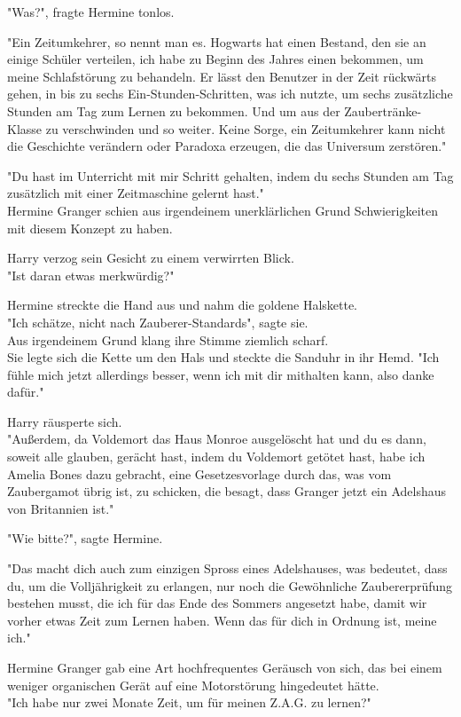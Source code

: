 {"Was?", fragte Hermine tonlos.

"Ein Zeitumkehrer, so nennt man es. Hogwarts hat einen Bestand, den sie an einige Schüler verteilen, ich habe zu Beginn des Jahres einen bekommen, um meine Schlafstörung zu behandeln. Er lässt den Benutzer in der Zeit rückwärts gehen, in bis zu sechs Ein-Stunden-Schritten, was ich nutzte, um sechs zusätzliche Stunden am Tag zum Lernen zu bekommen. Und um aus der Zaubertränke-Klasse zu verschwinden und so weiter. Keine Sorge, ein Zeitumkehrer kann nicht die Geschichte verändern oder Paradoxa erzeugen, die das Universum zerstören."

"Du hast im Unterricht mit mir Schritt gehalten, indem du sechs Stunden am Tag zusätzlich mit einer Zeitmaschine gelernt hast."\\ Hermine Granger schien aus irgendeinem unerklärlichen Grund Schwierigkeiten mit diesem Konzept zu haben.

Harry verzog sein Gesicht zu einem verwirrten Blick.\\ "Ist daran etwas merkwürdig?"

Hermine streckte die Hand aus und nahm die goldene Halskette.\\ "Ich schätze, nicht nach Zauberer-Standards", sagte sie.\\ Aus irgendeinem Grund klang ihre Stimme ziemlich scharf.\\ Sie legte sich die Kette um den Hals und steckte die Sanduhr in ihr Hemd. "Ich fühle mich jetzt allerdings besser, wenn ich mit dir mithalten kann, also danke dafür."

Harry räusperte sich.\\ "Außerdem, da Voldemort das Haus Monroe ausgelöscht hat und du es dann, soweit alle glauben, gerächt hast, indem du Voldemort getötet hast, habe ich Amelia Bones dazu gebracht, eine Gesetzesvorlage durch das, was vom Zaubergamot übrig ist, zu schicken, die besagt, dass Granger jetzt ein Adelshaus von Britannien ist."

"Wie bitte?", sagte Hermine.

"Das macht dich auch zum einzigen Spross eines Adelshauses, was bedeutet, dass du, um die Volljährigkeit zu erlangen, nur noch die Gewöhnliche Zaubererprüfung bestehen musst, die ich für das Ende des Sommers angesetzt habe, damit wir vorher etwas Zeit zum Lernen haben. Wenn das für dich in Ordnung ist, meine ich."

Hermine Granger gab eine Art hochfrequentes Geräusch von sich, das bei einem weniger organischen Gerät auf eine Motorstörung hingedeutet hätte.\\ "Ich habe nur zwei Monate Zeit, um für meinen Z.A.G. zu lernen?"

}
